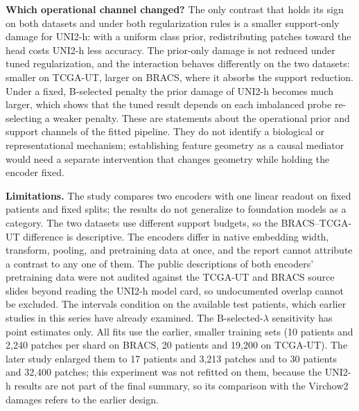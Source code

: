 \textbf{Which operational channel changed?} The only contrast that holds its sign on both datasets and under both regularization rules is a smaller support-only damage for UNI2-h: with a uniform class prior, redistributing patches toward the head costs UNI2-h less accuracy. The prior-only damage is not reduced under tuned regularization, and the interaction behaves differently on the two datasets: smaller on TCGA-UT, larger on BRACS, where it absorbs the support reduction. Under a fixed, B-selected penalty the prior damage of UNI2-h becomes much larger, which shows that the tuned result depends on each imbalanced probe re-selecting a weaker penalty. These are statements about the operational prior and support channels of the fitted pipeline. They do not identify a biological or representational mechanism; establishing feature geometry as a causal mediator would need a separate intervention that changes geometry while holding the encoder fixed.

\textbf{Limitations.} The study compares two encoders with one linear readout on fixed patients and fixed splits; the results do not generalize to foundation models as a category. The two datasets use different support budgets, so the BRACS--TCGA-UT difference is descriptive. The encoders differ in native embedding width, transform, pooling, and pretraining data at once, and the report cannot attribute a contrast to any one of them. The public descriptions of both encoders' pretraining data were not audited against the TCGA-UT and BRACS source slides beyond reading the UNI2-h model card, so undocumented overlap cannot be excluded. The intervals condition on the available test patients, which earlier studies in this series have already examined. The B-selected-$\lambda$ sensitivity has point estimates only. All fits use the earlier, smaller training sets (10 patients and 2,240 patches per shard on BRACS, 20 patients and 19,200 on TCGA-UT). The later study enlarged them to 17 patients and 3,213 patches and to 30 patients and 32,400 patches; this experiment was not refitted on them, because the UNI2-h results are not part of the final summary, so its comparison with the Virchow2 damages refers to the earlier design.
